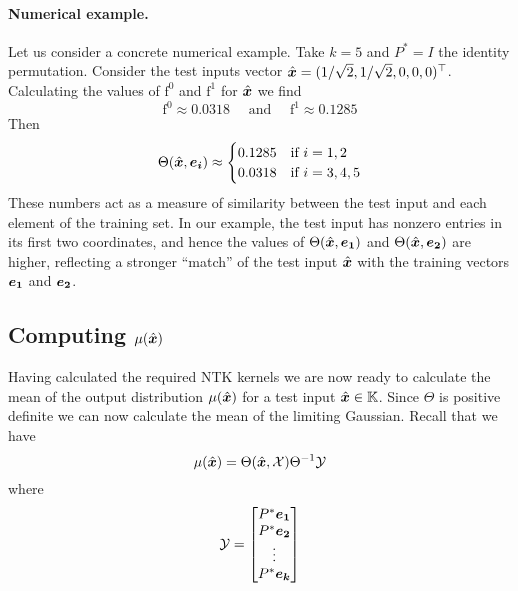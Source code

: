 \paragraph{Numerical example.}
Let us consider a concrete numerical example. Take $k = 5$ and $P^* = I$ the identity permutation. Consider the test inputs vector  $\hat{\boldsymbol{x}} = (1/\sqrt{2},1/\sqrt{2},  0,  0 , 0)^\top$. Calculating the values of $\mathrm{f^0}$ and $\mathrm{f^1}$ for $\hat{\boldsymbol{x}}$ we find 
\begin{equation}
    \mathrm{f^0} \approx 0.0318 \quad \textrm{ and } \quad\mathrm{f^1} \approx 0.1285
\end{equation}
Then 
\begin{equation*}
\Theta(\hat{\boldsymbol{x}}, \boldsymbol{e_i}) \approx \begin{cases}
    0.1285 & \text{if } i=1,2 \\ 
    0.0318 & \text{if } i=3,4,5
\end{cases} 
\end{equation*}
These numbers act as a measure of similarity between the test input and each element of the training set. In our example, the test input has nonzero entries in its first two coordinates, and hence the values of $\Theta(\hat{\boldsymbol{x}}, \boldsymbol{e_1})$ and $\Theta(\hat{\boldsymbol{x}}, \boldsymbol{e_2})$ are higher, reflecting a stronger ``match'' of the test input $\hat{\boldsymbol{x}}$ with the training vectors $\boldsymbol{e_1}$ and $\boldsymbol{e_2}$. 

\subsection{Computing  $\mu(\hat{\boldsymbol{x}})$}
Having calculated the required NTK kernels we are now ready to calculate the mean of the output distribution $\mu(\hat{\boldsymbol{x}})$ for a test input $\hat{\boldsymbol{x}} \in \mathbb{K}$.
Since $\Theta$ is positive definite we can now calculate the mean of the limiting Gaussian. Recall that we have
\begin{equation*}
    \mu(\hat{\boldsymbol{x}}) = \Theta(\hat{\boldsymbol{x}}, \mathcal{X})\Theta^{-1}\mathcal{Y}
\end{equation*}
where 
\begin{equation*}
\mathcal{Y} = \begin{bmatrix}
        P^*\boldsymbol{e_1} \\
        P^*\boldsymbol{e_2} \\
        \vdots \\
        P^*\boldsymbol{e_k}
    \end{bmatrix}
\end{equation*}

